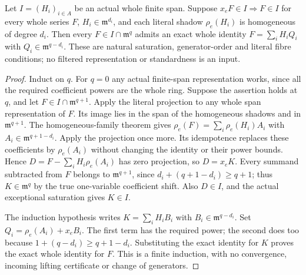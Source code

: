 \begin{theorem}
\label{hir:actual-exceptional-saturated-homogeneous-fibre-filtered-division}
\leanok
Let $I=(H_i)_{i\in A}$ be an actual whole finite span. Suppose
$x_eF\in I\Rightarrow F\in I$ for every whole series $F$,
$H_i\in\mathfrak m^{d_i}$, and each literal shadow
$\rho_e(H_i)$ is homogeneous of degree $d_i$.
Then every $F\in I\cap\mathfrak m^q$ admits an exact whole identity
$F=\sum_iH_iQ_i$ with $Q_i\in\mathfrak m^{q-d_i}$.
These are natural saturation, generator-order and literal fibre
conditions; no filtered representation or standardness is an input.
\end{theorem}
\begin{proof}
Induct on $q$. For $q=0$ any actual finite-span representation works,
since all the required coefficient powers are the whole ring.
Suppose the assertion holds at $q$, and let
$F\in I\cap\mathfrak m^{q+1}$.
Apply the literal projection to any whole span representation of $F$.
Its image lies in the span of the homogeneous shadows and in
$\mathfrak m^{q+1}$. The homogeneous-family theorem gives
$\rho_e(F)=\sum_i\rho_e(H_i)A_i$ with
$A_i\in\mathfrak m^{q+1-d_i}$.
Apply the projection once more. Its idempotence replaces these
coefficients by $\rho_e(A_i)$ without changing the identity or their
power bounds. Hence
$D=F-\sum_iH_i\rho_e(A_i)$ has zero projection, so $D=x_eK$.
Every summand subtracted from $F$ belongs to
$\mathfrak m^{q+1}$, since
$d_i+(q+1-d_i)\ge q+1$; thus $K\in\mathfrak m^q$ by the true
one-variable coefficient shift. Also $D\in I$, and the actual
exceptional saturation gives $K\in I$.

The induction hypothesis writes $K=\sum_iH_iB_i$ with
$B_i\in\mathfrak m^{q-d_i}$. Set
$Q_i=\rho_e(A_i)+x_eB_i$. The first term has the required power;
the second does too because $1+(q-d_i)\ge q+1-d_i$.
Substituting the exact identity for $K$ proves the exact whole
identity for $F$. This is a finite induction, with no convergence,
incoming lifting certificate or change of generators.
\end{proof}

